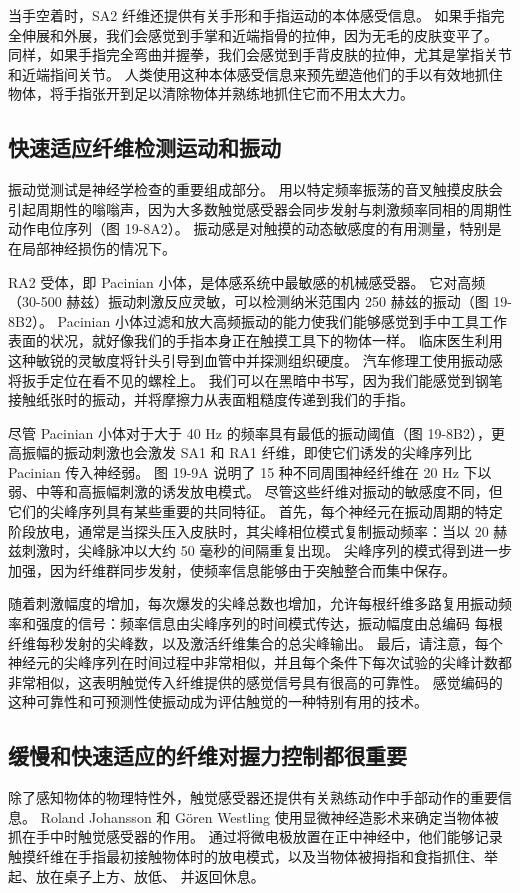 当手空着时，SA2 纤维还提供有关手形和手指运动的本体感受信息。 如果手指完全伸展和外展，我们会感觉到手掌和近端指骨的拉伸，因为无毛的皮肤变平了。 同样，如果手指完全弯曲并握拳，我们会感觉到手背皮肤的拉伸，尤其是掌指关节和近端指间关节。 人类使用这种本体感受信息来预先塑造他们的手以有效地抓住物体，将手指张开到足以清除物体并熟练地抓住它而不用太大力。

\subsection{快速适应纤维检测运动和振动}
振动觉测试是神经学检查的重要组成部分。 用以特定频率振荡的音叉触摸皮肤会引起周期性的嗡嗡声，因为大多数触觉感受器会同步发射与刺激频率同相的周期性动作电位序列（图 19-8A2）。 振动感是对触摸的动态敏感度的有用测量，特别是在局部神经损伤的情况下。

RA2 受体，即 Pacinian 小体，是体感系统中最敏感的机械感受器。 它对高频（30-500 赫兹）振动刺激反应灵敏，可以检测纳米范围内 250 赫兹的振动（图 19-8B2）。 Pacinian 小体过滤和放大高频振动的能力使我们能够感觉到手中工具工作表面的状况，就好像我们的手指本身正在触摸工具下的物体一样。 临床医生利用这种敏锐的灵敏度将针头引导到血管中并探测组织硬度。 汽车修理工使用振动感将扳手定位在看不见的螺栓上。 我们可以在黑暗中书写，因为我们能感觉到钢笔接触纸张时的振动，并将摩擦力从表面粗糙度传递到我们的手指。

尽管 Pacinian 小体对于大于 40 Hz 的频率具有最低的振动阈值（图 19-8B2），更高振幅的振动刺激也会激发 SA1 和 RA1 纤维，即使它们诱发的尖峰序列比 Pacinian 传入神经弱。 图 19-9A 说明了 15 种不同周围神经纤维在 20 Hz 下以弱、中等和高振幅刺激的诱发放电模式。 尽管这些纤维对振动的敏感度不同，但它们的尖峰序列具有某些重要的共同特征。 首先，每个神经元在振动周期的特定阶段放电，通常是当探头压入皮肤时，其尖峰相位模式复制振动频率：当以 20 赫兹刺激时，尖峰脉冲以大约 50 毫秒的间隔重复出现。 尖峰序列的模式得到进一步加强，因为纤维群同步发射，使频率信息能够由于突触整合而集中保存。

随着刺激幅度的增加，每次爆发的尖峰总数也增加，允许每根纤维多路复用振动频率和强度的信号：频率信息由尖峰序列的时间模式传达，振动幅度由总编码 每根纤维每秒发射的尖峰数，以及激活纤维集合的总尖峰输出。 最后，请注意，每个神经元的尖峰序列在时间过程中非常相似，并且每个条件下每次试验的尖峰计数都非常相似，这表明触觉传入纤维提供的感觉信号具有很高的可靠性。 感觉编码的这种可靠性和可预测性使振动成为评估触觉的一种特别有用的技术。

\subsection{缓慢和快速适应的纤维对握力控制都很重要}
除了感知物体的物理特性外，触觉感受器还提供有关熟练动作中手部动作的重要信息。 Roland Johansson 和 Gören Westling 使用显微神经造影术来确定当物体被抓在手中时触觉感受器的作用。 通过将微电极放置在正中神经中，他们能够记录触摸纤维在手指最初接触物体时的放电模式，以及当物体被拇指和食指抓住、举起、放在桌子上方、放低、 并返回休息。

